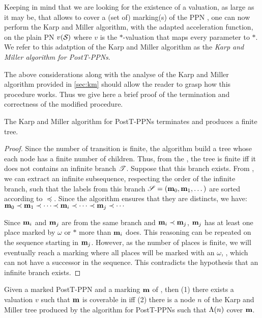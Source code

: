 Keeping in mind that we are looking for the existence of a valuation, as large as it may be, that allows to cover a (set of) marking(s) of the \ac{PPN} \namePPN, one can now perform the Karp and Miller algorithm, with the adapted acceleration function, on the plain \ac{PN} $v(\mathcal{S}_{{}})$ where $v$ is the $*$-valuation that maps every parameter to $*$.
We refer to this adatption of the Karp and Miller algorithm as the \emph{Karp and Miller algorithm for PostT-\acp{PPN}}.

The above considerations along with the analyse of the Karp and Miller algorithm provided in \cref{sec:km} should allow the reader to grasp how this procedure works.
Thus we give here a brief proof of the termination and correctness of the modified procedure.

\begin{theo}
  \label{theo:km-ecov-postt-ppn-termination}
  The Karp and Miller algorithm for PostT-\acp{PPN}
  terminates and produces a finite tree.
\end{theo}

\begin{proof}
  Since the number of transition is finite, the algorithm build a tree whose each node has a finite number of children.
  Thus, from the , the tree is finite iff it does not contains an infinite branch $\mathscr{T}$. 
  Suppose that this branch exists.
  From , we can extract an infinite subsequence, respecting the order of the infinite branch, such that the labels from this branch $\defInfSeq[\seq][\mar][0][1]$ are sorted according to $\preceq$.
  Since the algorithm ensures that they are distincts, we have:
  \( \elemsInfSeq[\mar][0][1][\prec \mar_i \prec \dotsb \prec \mar_j \prec \dotsb][\prec][\dotsb] \)
  
  Since $\mathbf{m}_i$ and $\mathbf{m}_j$ are from the same branch and $\mathbf{m}_i \prec \mathbf{m}_j$, $\mathbf{m}_j$ has at least one place marked by $\omega$ or $*$ more than $\mathbf{m}_i$ does.
  This reasoning can be repeated on the sequence starting in $\mathbf{m}_j$.
  However, as the number of places is finite, we will eventually reach a marking where all places will be marked with an $\omega$, \ie, which can not have a successor in the sequence.
  This contradicts the hypothesis that an infinite branch exists.
\end{proof}

\begin{theo}
  \label{theo:km-ecov-postt-ppn-correctness}
  Given a marked PostT-\ac{PPN} \namePPN and a marking $\mathbf{m}$ of \namePPN,
    then \qquad (1)
    there exists a valuation $v$ such that $\mathbf{m}$ is coverable in \namePPN
    \qquad iff \qquad (2)
    there is a node $n$ of the Karp and Miller tree produced by the algorithm for PostT-\acp{PPN}
      such that $\operatorname{\Lambda}(n)$ cover $\mathbf{m}$.
\end{theo}

